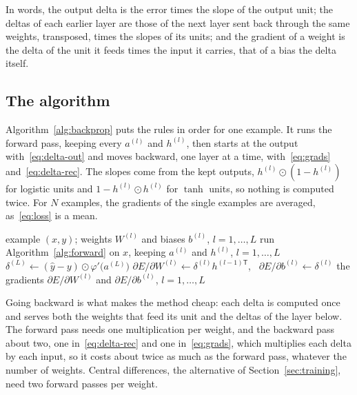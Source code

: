 \documentclass[11pt,a4paper]{amsart}
\numberwithin{equation}{section}
\theoremstyle{plain}
\theoremstyle{definition}
\theoremstyle{remark}
\newcommand{\T}{\mathsf{T}}
\newcommand{\had}{\odot}
\begin{document}
In words, the output delta is the error times the slope of the output
unit; the deltas of each earlier layer are those of the next layer sent
back through the same weights, transposed, times the slopes of its
units; and the gradient of a weight is the delta of the unit it feeds
times the input it carries, that of a bias the delta itself.

\subsection{The algorithm}\label{sec:algorithm}

Algorithm~\ref{alg:backprop} puts the rules in order for one example. It
runs the forward pass, keeping every $a^{(l)}$ and $h^{(l)}$, then starts
at the output with~\eqref{eq:delta-out} and moves backward, one layer at
a time, with~\eqref{eq:grads} and~\eqref{eq:delta-rec}. The slopes come
from the kept outputs, $h^{(l)} \had (1 - h^{(l)})$ for logistic units
and $1 - h^{(l)} \had h^{(l)}$ for $\tanh$ units, so nothing is computed
twice. For $N$ examples, the gradients of the single examples are
averaged, as~\eqref{eq:loss} is a mean.

\begin{algorithm}[b]
\caption{Backpropagation for one example}\label{alg:backprop}
\small
\begin{algorithmic}[1]
\Require example $(x, y)$; weights $W^{(l)}$ and biases $b^{(l)}$,
  $l = 1, \dots, L$
\State run Algorithm~\ref{alg:forward} on $x$, keeping $a^{(l)}$ and
  $h^{(l)}$, $l = 1, \dots, L$
\State $\delta^{(L)} \gets (\hat y - y) \had \varphi'\bigl(a^{(L)}\bigr)$
  \State $\partial E / \partial W^{(l)} \gets \delta^{(l)} h^{(l-1)\T}$,
    \ $\partial E / \partial b^{(l)} \gets \delta^{(l)}$
  \IfThen{$l > 1$}{$\delta^{(l-1)} \gets \bigl(W^{(l)\T}
    \delta^{(l)}\bigr) \had \varphi'\bigl(a^{(l-1)}\bigr)$}
\EndFor
\State \Return the gradients $\partial E / \partial W^{(l)}$ and
  $\partial E / \partial b^{(l)}$, $l = 1, \dots, L$
\end{algorithmic}
\end{algorithm}

Going backward is what makes the method cheap: each delta is computed
once and serves both the weights that feed its unit and the deltas of
the layer below. The forward pass needs one multiplication per weight,
and the backward pass about two, one in~\eqref{eq:delta-rec} and one
in~\eqref{eq:grads}, which multiplies each delta by each input, so it
costs about twice as much as the forward pass, whatever the number of
weights. Central differences, the alternative of
Section~\ref{sec:training}, need two forward passes per weight.
\end{document}
